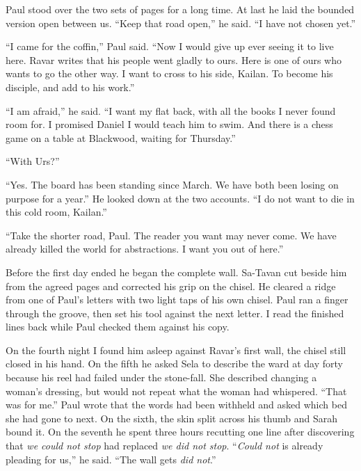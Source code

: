 Paul stood over the two sets of pages for a long time. At last he laid the bounded version open between us. ``Keep that road open,'' he said. ``I have not chosen yet.''\par

``I came for the coffin,'' Paul said. ``Now I would give up ever seeing it to live here. Ravar writes that his people went gladly to ours. Here is one of ours who wants to go the other way. I want to cross to his side, Kailan. To become his disciple, and add to his work.''\par

``I am afraid,'' he said. ``I want my flat back, with all the books I never found room for. I promised Daniel I would teach him to swim. And there is a chess game on a table at Blackwood, waiting for Thursday.''\par

``With Urs?''\par

``Yes. The board has been standing since March. We have both been losing on purpose for a year.'' He looked down at the two accounts. ``I do not want to die in this cold room, Kailan.''\par

``Take the shorter road, Paul. The reader you want may never come. We have already killed the world for abstractions. I want you out of here.''\par

Before the first day ended he began the complete wall. Sa-Tavan cut beside him from the agreed pages and corrected his grip on the chisel. He cleared a ridge from one of Paul's letters with two light taps of his own chisel. Paul ran a finger through the groove, then set his tool against the next letter. I read the finished lines back while Paul checked them against his copy.\par

On the fourth night I found him asleep against Ravar's first wall, the chisel still closed in his hand. On the fifth he asked Sela to describe the ward at day forty because his reel had failed under the stone-fall. She described changing a woman's dressing, but would not repeat what the woman had whispered. ``That was for me.'' Paul wrote that the words had been withheld and asked which bed she had gone to next. On the sixth, the skin split across his thumb and Sarah bound it. On the seventh he spent three hours recutting one line after discovering that \emph{we could not stop} had replaced \emph{we did not stop}. ``\emph{Could not} is already pleading for us,'' he said. ``The wall gets \emph{did not}.''\par

